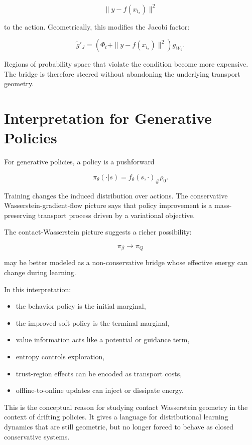 \[
\|y-f(x_{t_s})\|^2
\]

to the action. Geometrically, this modifies the Jacobi factor:

\[
\widetilde g'_J
=
\left(
\Phi_t+\|y-f(x_{t_s})\|^2
\right)g_{W_2}.
\]

Regions of probability space that violate the condition become more expensive.
The bridge is therefore steered without abandoning the underlying transport
geometry.

\section{Interpretation for Generative Policies}

For generative policies, a policy is a pushforward

\[
\pi_\theta(\cdot|s)
=
f_\theta(s,\cdot)_\#\rho_0.
\]

Training changes the induced distribution over actions. The conservative
Wasserstein-gradient-flow picture says that policy improvement is a
mass-preserving transport process driven by a variational objective.

The contact-Wasserstein picture suggests a richer possibility:

\[
\pi_\beta
\longrightarrow
\pi_Q
\]

may be better modeled as a non-conservative bridge whose effective energy can
change during learning.

In this interpretation:

\begin{itemize}
    \item the behavior policy is the initial marginal,
    \item the improved soft policy is the terminal marginal,
    \item value information acts like a potential or guidance term,
    \item entropy controls exploration,
    \item trust-region effects can be encoded as transport costs,
    \item offline-to-online updates can inject or dissipate energy.
\end{itemize}

This is the conceptual reason for studying contact Wasserstein geometry in
the context of drifting policies. It gives a language for distributional
learning dynamics that are still geometric, but no longer forced to behave as
closed conservative systems.
